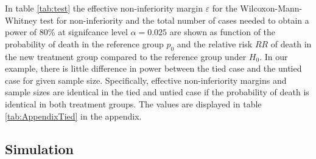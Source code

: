 \documentclass[bimj,fleqn]{w-art}\usepackage[]{graphicx}\usepackage[]{color}
\theoremstyle{plain}
\theoremstyle{definition}
\begin{document}
In table \ref{tab:test} the effective non-inferiority margin $\varepsilon$ for the
Wilcoxon-Mann-Whitney test for non-inferiority and the total number of cases
needed to obtain a power of 80\% at signifcance level $\alpha =0.025$ are
shown as function of the probability of death in the reference group $p_0$ and
the relative risk $RR$ of death in the new treatment group compared to the
reference group under $H_0$.
In our example, there is little difference in power between the tied case
and the untied case for given sample size. Specifically, effective
non-inferiority margins and sample sizes are identical in the tied and untied
case if the probability of death is identical in both treatment groups. The
values are  displayed in table \ref{tab:AppendixTied} in the appendix.

\subsection{Simulation}
\label{sec:Sim}
\end{document}
